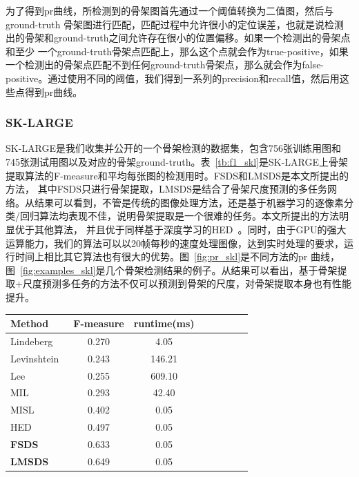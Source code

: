 \documentclass[UTF8]{ctexart}
\numberwithin{equation}{section} %
\numberwithin{table}{section} %
\begin{document}
为了得到pr曲线，所检测到的骨架图首先通过一个阈值转换为二值图，然后与 ground-truth 骨架图进行匹配，匹配过程中允许很小的定位误差，也就是说检测出的骨架和ground-truth之间允许存在很小的位置偏移。如果一个检测出的骨架点和至少
一个ground-truth骨架点匹配上，那么这个点就会作为true-positive，如果一个检测出的骨架点匹配不到任何ground-truth骨架点，那么就会作为false-positive。通过使用不同的阈值，我们得到一系列的precision和recall值，然后用这些点得到pr曲线。

\subsubsection{SK-LARGE}
SK-LARGE是我们收集并公开的一个骨架检测的数据集，包含756张训练用图和745张测试用图以及对应的骨架ground-truth。表~\ref{tb:f1_skl}是SK-LARGE上骨架提取算法的F-measure和平均每张图的检测用时。FSDS和LMSDS是本文所提出的方法，
其中FSDS只进行骨架提取，LMSDS是结合了骨架尺度预测的多任务网络。从结果可以看到，不管是传统的图像处理方法，还是基于机器学习的逐像素分类/回归算法均表现不佳，说明骨架提取是一个很难的任务。本文所提出的方法明显优于其他算法，
并且优于同样基于深度学习的HED~\cite{xie2015holistically}。同时，由于GPU的强大运算能力，我们的算法可以以20帧每秒的速度处理图像，达到实时处理的要求，运行时间上相比其它算法也有很大的优势。图~\ref{fig:pr_skl}是不同方法的pr
曲线，图~\ref{fig:examples_skl}是几个骨架检测结果的例子。从结果可以看出，基于骨架提取+尺度预测多任务的方法不仅可以预测到骨架的尺度，对骨架提取本身也有性能提升。
\begin{center}
\begin{tabular}{l*{6}{c}r}
Method            & F-measure & runtime(ms) \\
\hline
Lindeberg~\cite{lindeberg1998edge} & 0.270 & 4.05  \\
Levinshtein~\cite{levinshtein2013multiscale} & 0.243 & 146.21  \\
Lee~\cite{sie2013detecting} & 0.255 & 609.10  \\
MIL~\cite{tsogkas2012learning} & 0.293 & 42.40  \\
MISL~\cite{shen2016multiple} & 0.402 & 0.05  \\
HED~\cite{xie2015holistically} & 0.497 & 0.05 \\
\textbf{FSDS}     & 0.633 &0.05 \\
\textbf{LMSDS}     & 0.649 &0.05 \\
\hline
\end{tabular}
\label{tb:f1_skl}
\end{center}
\end{document}
